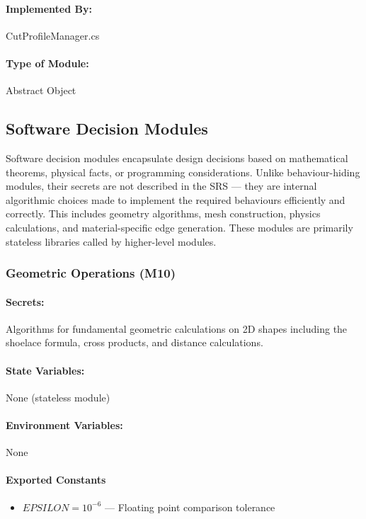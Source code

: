 \documentclass[12pt, titlepage]{article}
\begin{document}
\paragraph{Implemented By:}
CutProfileManager.cs

\paragraph{Type of Module:}
Abstract Object

\vspace{10mm}

\subsection{Software Decision Modules}

Software decision modules encapsulate design decisions based on mathematical theorems,
physical facts, or programming considerations. Unlike behaviour-hiding modules, their
secrets are not described in the SRS --- they are internal algorithmic choices made to
implement the required behaviours efficiently and correctly. This includes geometry
algorithms, mesh construction, physics calculations, and material-specific edge generation.
These modules are primarily stateless libraries called by higher-level modules.

\subsubsection{Geometric Operations (M10)} \label{M10}

\paragraph{Secrets:}
Algorithms for fundamental geometric calculations on 2D shapes including the shoelace formula,
cross products, and distance calculations.

\paragraph{State Variables:}
None (stateless module)

\paragraph{Environment Variables:}
None

\paragraph{Exported Constants}
\begin{itemize}
\item $EPSILON = 10^{-6}$ --- Floating point comparison tolerance
\end{itemize}
\end{document}
